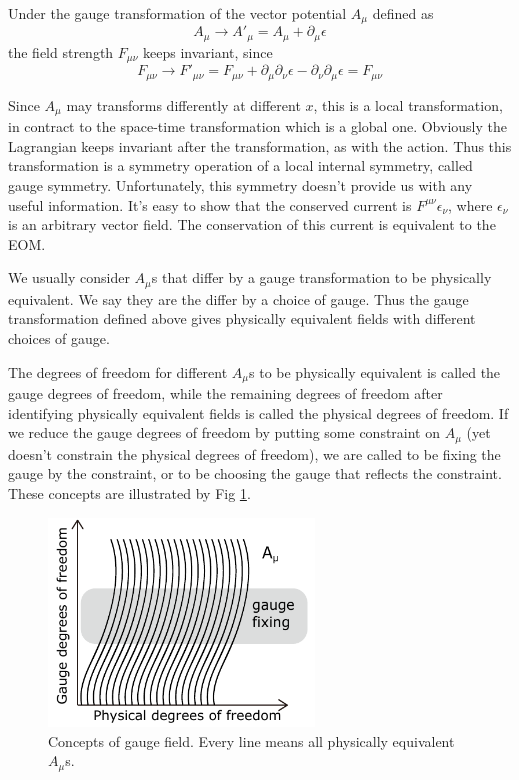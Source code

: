 \documentclass[12pt]{book}
\begin{document}
	Under the gauge transformation of the vector potential $A_\mu$ defined as
	\begin{equation}
		A_\mu\longrightarrow A'_\mu=A_\mu+\partial_\mu\epsilon \label{eqn:gauge-trans}
	\end{equation}	
	the field strength $F_{\mu\nu}$ keeps invariant, since
	\begin{equation}
		F_{\mu\nu}\longrightarrow F'_{\mu\nu}=F_{\mu\nu}+\partial_\mu\partial_\nu\epsilon-\partial_\nu\partial_\mu\epsilon=F_{\mu\nu}
	\end{equation}	
	
	Since $A_\mu$ may transforms differently at different $x$, this is a local transformation, in contract to the space-time transformation which is a global one. Obviously the Lagrangian keeps invariant after the transformation, as with the action. Thus this transformation is a symmetry operation of a local internal symmetry, called gauge symmetry. Unfortunately, this symmetry doesn't provide us with any useful information. It's easy to show that the conserved current is $F^{\mu\nu}\epsilon_\nu$, where $\epsilon_\nu$ is an arbitrary vector field. The conservation of this current is equivalent to the EOM.
	
	We usually consider $A_\mu$s that differ by a gauge transformation to be physically equivalent. We say they are the differ by a choice of gauge. Thus the gauge transformation defined above gives physically equivalent fields with different choices of gauge.
	
	The degrees of freedom for different $A_\mu$s to be physically equivalent is called the gauge degrees of freedom, while the remaining degrees of freedom after identifying physically equivalent fields is called the physical degrees of freedom.  If we reduce the gauge degrees of freedom by putting some constraint on $A_\mu$ (yet doesn't constrain the physical degrees of freedom), we are called to be fixing the gauge by the constraint, or to be choosing the gauge that reflects the constraint. These concepts are illustrated by Fig \ref{fig:gauge}.
	
	\begin{figure}[htb]
		\centering  
		\includegraphics[width=200pt]{resources/chap_classical/1_9_gauge.pdf}
		\caption{Concepts of gauge field. Every line means all physically equivalent $A_\mu$s.}
		\label{fig:gauge} 
	\end{figure}
	
\end{document}
